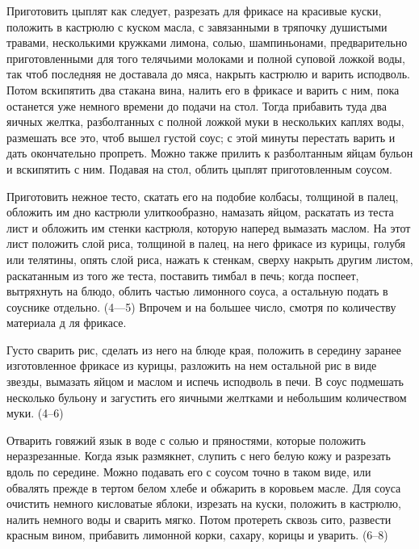 
Приготовить цыплят как следует, разрезать для фрикасе на красивые куски, положить в кастрюлю с куском масла, с завязанными в тряпочку душистыми травами, несколькими кружками лимона, солью, шампиньонами, предварительно приготовленными для того телячьими молоками и полной суповой ложкой воды, так чтоб последняя не доставала до мяса, накрыть кастрюлю и варить исподволь. Потом вскипятить два стакана вина, налить его в фрикасе и варить с ним, пока останется уже немного времени до подачи на стол. Тогда прибавить туда два яичных желтка, разболтанных с полной ложкой муки в нескольких каплях воды, размешать все это, чтоб вышел густой соус; с этой минуты перестать варить и дать окончательно пропреть. Можно также прилить к разболтанным яйцам бульон и вскипятить с ним. Подавая на стол, облить цыплят приготовленным соусом. 


Приготовить нежное тесто, скатать его на подобие колбасы, толщиной в палец, обложить им дно кастрюли улиткообразно, намазать яйцом, раскатать из теста лист и обложить им стенки кастрюля, которую наперед вымазать маслом. На этот лист положить слой риса, толщиной в палец, на него фрикасе из курицы, голубя или телятины, опять слой риса, нажать к стенкам, сверху накрыть другим листом, раскатанным из того же теста, поставить тимбал в печь; когда поспеет, вытряхнуть на блюдо, облить частью лимонного соуса, а остальную подать в соуснике отдельно. (4—5) Впрочем и на большее число, смотря по количеству материала д ля фрикасе. 


Густо сварить рис, сделать из него на блюде края, положить в середину заранее изготовленное фрикасе из курицы, разложить на нем остальной рис в виде звезды, вымазать яйцом и маслом и испечь исподволь в печи. В соус подмешать несколько бульону и загустить его яичными желтками и небольшим количеством муки. (4--6) 


Отварить говяжий язык в воде с солью и пряностями, которые положить неразрезанные. Когда язык размякнет, слупить с него белую кожу и разрезать вдоль по середине. Можно подавать его с соусом точно в таком виде, или обвалять прежде в тертом белом хлебе и обжарить в коровьем масле. Для соуса очистить немного кисловатые яблоки, изрезать на куски, положить в кастрюлю, налить немного воды и сварить мягко. Потом протереть сквозь сито, развести красным вином, прибавить лимонной корки, сахару, корицы и уварить. (6--8) 

